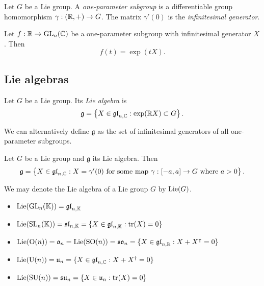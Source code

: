 \begin{definition}
    Let $G$ be a Lie group. A \emph{one-parameter subgroup} is a differentiable group homomorphism $\gamma: (\R, +) \to G$. The matrix $\gamma'(0)$ is the \emph{infinitesimal generator}.
\end{definition}

\begin{theorem}
    Let $f: \R \to \GL_n(\C)$ be a one-parameter subgroup with infinitesimal generator $X$. Then
    \[ f(t) = \exp(tX). \]
\end{theorem}

\subsection{Lie algebras}

\begin{definition}
    Let $G$ be a Lie group. Its \emph{Lie algebra} is
    \[ \mathfrak g = \left\{
        X \in \gl[n, \C]: \exp(\R X) \subset G
        \right\}. \]
\end{definition}

We can alternatively define $\mathfrak g$ as the set of infinitesimal generators of all one-parameter subgroups.

\begin{proposition}
    Let $G$ be a Lie group and $\mathfrak g$ its Lie algebra. Then
    \[ \mathfrak g = \left\{
        X \in \gl[n, \C]: \text{$X = \gamma'(0)$ for some map $\gamma:[-a, a] \to G$ where $a > 0$}
        \right\}. \]
\end{proposition}

We may denote the Lie algebra of a Lie group $G$ by $\Lie(G)$.

\begin{example}\hspace{0em}
    \begin{itemize}
        \item $\Lie(\GL_n(\K)) = \gl[n, \K]$
        \item $\Lie(\SL_n(\K)) = \sl[n, \K] = \{X \in \gl[n, \K]: \tr(X) = 0\}$
        \item $\Lie(\O(n)) = \mathfrak o_n = \Lie(\SO(n)) = \mathfrak{so}_n = \{X \in \gl[n, \R]: X + X^\intercal = 0\}$
        \item $\Lie(\U(n)) = \mathfrak{u}_n = \{X \in \gl[n, \C]: X + X^\dagger = 0\}$
        \item $\Lie(\SU(n)) = \mathfrak{su}_n = \{X \in \mathfrak u_n: \tr(X) = 0\}$
    \end{itemize}
\end{example}


